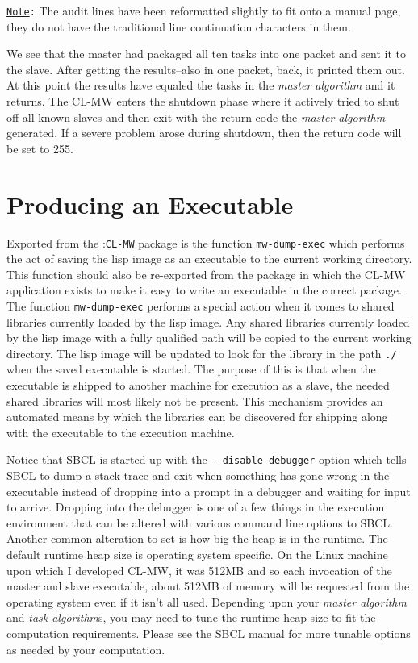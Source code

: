 \documentclass[titlepage,12pt]{book}
\newcommand{\xsmall}{\latexhtml{\small}{}}
\newcommand{\xnormalsize}{\latexhtml{\normalsize}{}}
\newcommand{\sbcl}{SBCL\xspace}
\newcommand{\clmw}{\xsmall\textsc{CL-MW}\xnormalsize\xspace}
\newcommand{\package}[1]{\mbox{:\uppercase{\xsmall\texttt{#1}\xnormalsize}} package\xspace}
\newcommand{\mwpackage}{\package{CL-MW}}
\newcommand{\ma}{\textit{master algorithm}\xspace}
\newcommand{\tas}{\textit{task algorithm}s\xspace}
\newcommand{\dash}{\texttt{-}}
\newcommand{\func}[1]{\mbox{\texttt{#1}}\xspace}
\newcommand{\file}[1]{\texttt{#1}\xspace}
\newcommand{\Option}[1]{\dash\dash\texttt{#1}}
\newcommand{\Note}{\texttt{\underline{Note}:}\xspace}
\begin{document}
\Note The audit lines have been reformatted slightly to fit onto
a manual page, they do not have the traditional line continuation
characters in them.

We see that the master had packaged all ten tasks into one packet and
sent it to the slave. After getting the results--also in one packet,
back, it printed them out. At this point the results have equaled
the tasks in the \ma and it returns. The \clmw enters the shutdown
phase where it actively tried to shut off all known slaves and then
exit with the return code the \ma generated. If a severe problem
arose during shutdown, then the return code will be set to 255.

\section{Producing an Executable}

Exported from the \mwpackage is the function \func{mw-dump-exec}
which performs the act of saving the lisp image as an executable
to the current working directory. This function should also be
re-exported from the package in which the \clmw application exists
to make it easy to write an executable in the correct package. The
function \func{mw-dump-exec} performs a special action when it comes
to shared libraries currently loaded by the lisp image.  Any shared
libraries currently loaded by the lisp image with a fully qualified
path will be copied to the current working directory. The lisp image
will be updated to look for the library in the path \file{./} when
the saved executable is started. The purpose of this is that when the
executable is shipped to another machine for execution as a slave, the
needed shared libraries will most likely not be present. This mechanism
provides an automated means by which the libraries can be discovered
for shipping along with the executable to the execution machine.

Notice that \sbcl is started up with the \Option{disable-debugger}
option which tells \sbcl to dump a stack trace and exit when something
has gone wrong in the executable instead of dropping into a prompt
in a debugger and waiting for input to arrive.  Dropping into the
debugger is one of a few things in the execution environment that
can be altered with various command line options to \sbcl. Another
common alteration to set is how big the heap is in the runtime.
The default runtime heap size is operating system specific. On the
Linux machine upon which I developed \clmw, it was 512MB and so
each invocation of the master and slave executable, about 512MB of
memory will be requested from the operating system even if it isn't
all used. Depending upon your \ma and \tas, you may need to tune the
runtime heap size to fit the computation requirements. Please see the
\sbcl manual for more tunable options as needed by your computation.
\end{document}
